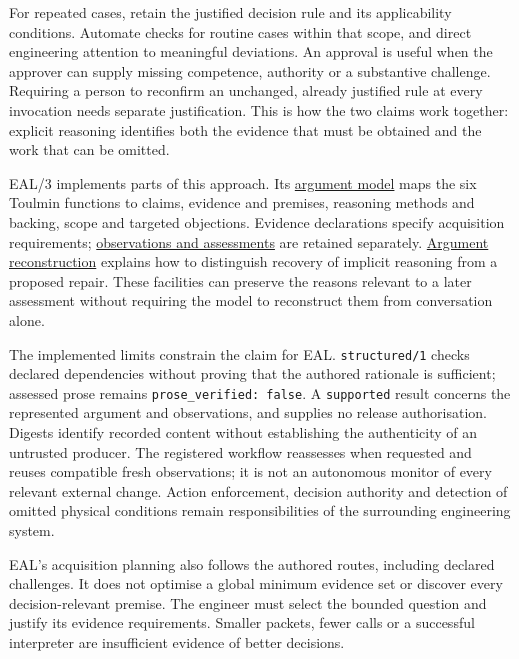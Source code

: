 \documentclass[11pt,a4paper]{article}
\begin{document}
For repeated cases, retain the justified decision rule and its applicability conditions. Automate checks for routine cases within that scope, and direct engineering attention to meaningful deviations. An approval is useful when the approver can supply missing competence, authority or a substantive challenge. Requiring a person to reconfirm an unchanged, already justified rule at every invocation needs separate justification. This is how the two claims work together: explicit reasoning identifies both the evidence that must be obtained and the work that can be omitted.

EAL/3 implements parts of this approach. Its \href{https://github.com/emmett08/earl/blob/main/docs/argument-model.md}{argument model} maps the six Toulmin functions to claims, evidence and premises, reasoning methods and backing, scope and targeted objections. Evidence declarations specify acquisition requirements; \href{https://github.com/emmett08/earl/blob/main/docs/argument-service.md}{observations and assessments} are retained separately. \href{https://github.com/emmett08/earl/blob/main/docs/argument-reconstruction.md}{Argument reconstruction} explains how to distinguish recovery of implicit reasoning from a proposed repair. These facilities can preserve the reasons relevant to a later assessment without requiring the model to reconstruct them from conversation alone.

The implemented limits constrain the claim for EAL. \texttt{structured/1} checks declared dependencies without proving that the authored rationale is sufficient; assessed prose remains \texttt{prose\_verified:\ false}. A \texttt{supported} result concerns the represented argument and observations, and supplies no release authorisation. Digests identify recorded content without establishing the authenticity of an untrusted producer. The registered workflow reassesses when requested and reuses compatible fresh observations; it is not an autonomous monitor of every relevant external change. Action enforcement, decision authority and detection of omitted physical conditions remain responsibilities of the surrounding engineering system.

EAL's acquisition planning also follows the authored routes, including declared challenges. It does not optimise a global minimum evidence set or discover every decision-relevant premise. The engineer must select the bounded question and justify its evidence requirements. Smaller packets, fewer calls or a successful interpreter are insufficient evidence of better decisions.
\end{document}
